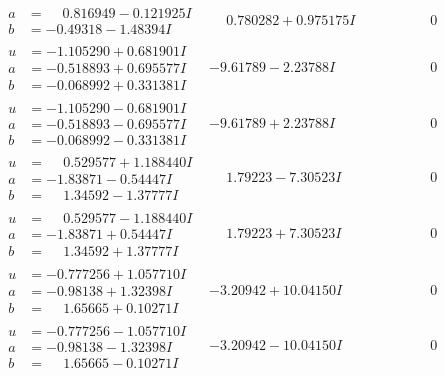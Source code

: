 \documentclass[1p]{elsarticle_modified}
\theoremstyle{definition}
\begin{document}
$$\begin{array}{c|c|c}
\begin{aligned}
a &= \phantom{-}0.816949 - 0.121925 I \\
b &= -0.49318 - 1.48394 I\end{aligned}
 & \phantom{-}0.780282 + 0.975175 I & \phantom{-0.000000 } 0 \\ \hline\begin{aligned}
u &= -1.105290 + 0.681901 I \\
a &= -0.518893 + 0.695577 I \\
b &= -0.068992 + 0.331381 I\end{aligned}
 & -9.61789 - 2.23788 I & \phantom{-0.000000 } 0 \\ \hline\begin{aligned}
u &= -1.105290 - 0.681901 I \\
a &= -0.518893 - 0.695577 I \\
b &= -0.068992 - 0.331381 I\end{aligned}
 & -9.61789 + 2.23788 I & \phantom{-0.000000 } 0 \\ \hline\begin{aligned}
u &= \phantom{-}0.529577 + 1.188440 I \\
a &= -1.83871 - 0.54447 I \\
b &= \phantom{-}1.34592 - 1.37777 I\end{aligned}
 & \phantom{-}1.79223 - 7.30523 I & \phantom{-0.000000 } 0 \\ \hline\begin{aligned}
u &= \phantom{-}0.529577 - 1.188440 I \\
a &= -1.83871 + 0.54447 I \\
b &= \phantom{-}1.34592 + 1.37777 I\end{aligned}
 & \phantom{-}1.79223 + 7.30523 I & \phantom{-0.000000 } 0 \\ \hline\begin{aligned}
u &= -0.777256 + 1.057710 I \\
a &= -0.98138 + 1.32398 I \\
b &= \phantom{-}1.65665 + 0.10271 I\end{aligned}
 & -3.20942 + 10.04150 I & \phantom{-0.000000 } 0 \\ \hline\begin{aligned}
u &= -0.777256 - 1.057710 I \\
a &= -0.98138 - 1.32398 I \\
b &= \phantom{-}1.65665 - 0.10271 I\end{aligned}
 & -3.20942 - 10.04150 I & \phantom{-0.000000 } 0 \\ \hline\begin{aligned}

\end{aligned}
\end{array}$$
\end{document}
